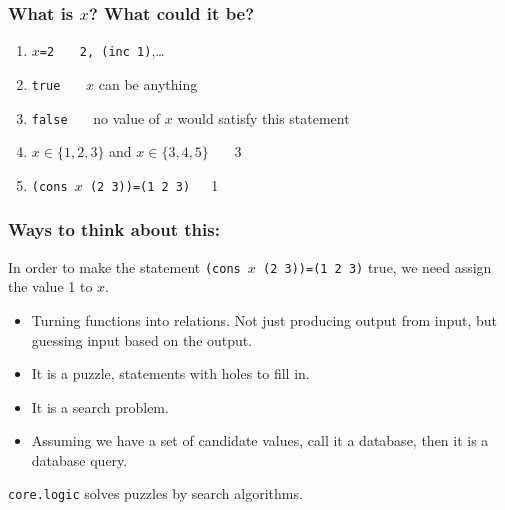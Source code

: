 \documentclass{beamer}
\begin{document}
\begin{frame}\frametitle{What is $x$? What could it be?}
\begin{enumerate}
\item $x$\texttt{=2} \pause\ \ \ \texttt{2, (inc 1)},\ldots\pause
\item \texttt{true} \pause\ \ \ $x$ can be anything\pause
\item \texttt{false} \pause\ \ \ no value of $x$ would satisfy this
  statement\pause
\item $x\in\{1,2,3\}$ and $x\in\{3,4,5\}$ \pause\ \ \ 3\pause
\item \texttt{(cons $x$ (2 3))=(1 2 3)}\pause\ \ \ 1
\end{enumerate}
\end{frame}


\begin{frame}\frametitle{Ways to think about this:}
In order to make the statement \texttt{(cons $x$ (2 3))=(1 2 3)} true,
we need assign the value 1 to $x$.

\begin{itemize}
\item Turning functions into relations. Not just producing output from
  input, but guessing input based on the output.
\item It is a puzzle, statements with holes to fill in.
\item It is a search problem.
\item Assuming we have a set of candidate values, call it a database,
  then it is a database query.
\end{itemize}

\pause
\texttt{core.logic} solves puzzles by search algorithms.
\end{frame}
\end{document}
